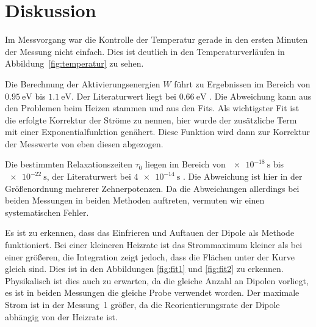\section{Diskussion}
\label{sec:Diskussion}

Im Messvorgang war die Kontrolle der Temperatur gerade in den ersten Minuten
der Messung nicht einfach. Dies ist deutlich in den Temperaturverläufen in
Abbildung~\ref{fig:temperatur} zu sehen.

Die Berechnung der Aktivierungsenergien $W$ führt zu Ergebnissen
im Bereich von $\SI{0.95}{\electronvolt}$ bis $\SI{1.1}{\electronvolt}$.
Der Literaturwert liegt bei $\SI{0.66}{\electronvolt}$ \cite{muccillo}.
Die Abweichung kann aus den Problemen beim Heizen stammen und aus den Fits.
Als wichtigster Fit ist die erfolgte Korrektur der Ströme zu nennen,
hier wurde der zusätzliche Term mit einer Exponentialfunktion genähert.
Diese Funktion wird dann zur Korrektur der Messwerte von eben diesen abgezogen.

Die bestimmten Relaxationszeiten $τ_0$ liegen im Bereich von $\SI{e-18}{\second}$
bis $\SI{e-22}{\second}$, der Literaturwert bei $\SI{4e-14}{\second}$ \cite{muccillo}.
Die Abweichung ist hier in der Größenordnung mehrerer Zehnerpotenzen.
Da die Abweichungen allerdings bei beiden Messungen in beiden Methoden auftreten,
vermuten wir einen systematischen Fehler.

Es ist zu erkennen, dass das Einfrieren und Auftauen der Dipole als Methode funktioniert.
Bei einer kleineren Heizrate ist das Strommaximum kleiner als bei einer größeren,
die Integration zeigt jedoch, dass die Flächen unter der Kurve gleich sind.
Dies ist in den Abbildungen \ref{fig:fit1} und \ref{fig:fit2} zu erkennen.
Physikalisch ist dies auch zu erwarten, da die gleiche Anzahl an Dipolen vorliegt,
es ist in beiden Messungen die gleiche Probe verwendet worden.
Der maximale Strom ist in der Messung~1 größer, da die Reorientierungsrate
der Dipole abhängig von der Heizrate ist.
